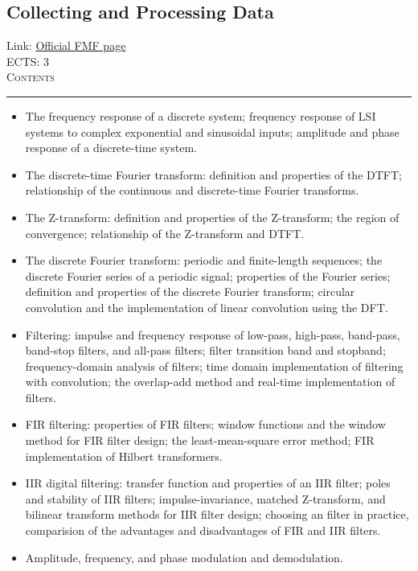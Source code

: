 \documentclass[11pt, a4paper]{article}
\newenvironment{course}[3]{
\subsection{#1}%
Link: \href{#2}{Official FMF page}\\%
ECTS: #3%
\vspace{1ex}
\\
{\large \textsc{Contents}}\\[-0.9ex]%
\rule{\textwidth}{0.5pt}
\vspace{-3ex}
}
{}
\newenvironment{chapter}[1]{
\begin{tcolorbox}[title=#1, breakable]
}
{\end{tcolorbox}}
\begin{document}
\begin{course}{Collecting and Processing Data}{https://www.fmf.uni-lj.si/en/study-physics/programmes/1fiz/2020/7000777/courses/1178/}{3}
\begin{chapter}{Digital signal processing}
\begin{itemize}
            \item The frequency response of a discrete system; frequency response of LSI systems to complex exponential and sinusoidal inputs; amplitude and phase response of a discrete-time system.

            \item The discrete-time Fourier transform: definition and properties of the DTFT; relationship of the continuous and discrete-time Fourier transforms.
            
            \item The Z-transform: definition and properties of the Z-transform; the region of convergence; relationship of the Z-transform and DTFT.

            \item The discrete Fourier transform: periodic and finite-length sequences; the discrete Fourier series of a periodic signal; properties of the Fourier series; definition and properties of the discrete Fourier transform; circular convolution and the implementation of linear convolution using the DFT.

            \item Filtering: impulse and frequency response of low-pass, high-pass, band-pass, band-stop filters, and all-pass filters; filter transition band and stopband; frequency-domain analysis of filters; time domain implementation of filtering with convolution;
            the overlap-add method and real-time implementation of filters.
            
            \item FIR filtering: properties of FIR filters; window functions and the window method for FIR filter design; the least-mean-square error method; FIR implementation of Hilbert transformers.

            \item IIR digital filtering: transfer function and properties of an IIR filter; poles and stability of IIR filters; impulse-invariance, matched Z-transform, and bilinear transform methods for IIR filter design;
            choosing an filter in practice, comparision of the advantages and disadvantages of FIR and IIR filters.

            \item Amplitude, frequency, and phase modulation and demodulation.
        
        \end{itemize}
    \end{chapter}
\end{course}
\end{document}
